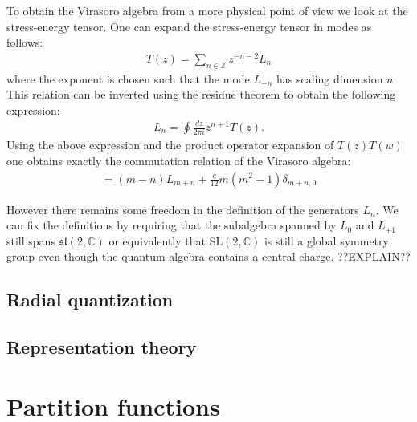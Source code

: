 	To obtain the Virasoro algebra from a more physical point of view we look at the stress-energy tensor. One can expand the stress-energy tensor in modes as follows:
	\begin{gather}
		T(z) = \sum_{n\in\mathbb{Z}}z^{-n-2}L_n
	\end{gather}
	where the exponent is chosen such that the mode $L_{-n}$ has scaling dimension $n$. This relation can be inverted using the residue theorem to obtain the following expression:
	\begin{gather}
		L_n = \oint\frac{dz}{2\pi i}z^{n+1}T(z).
	\end{gather}
	Using the above expression and the product operator expansion of $T(z)T(w)$ one obtains exactly the commutation relation of the Virasoro algebra:
	\begin{gather}
		[L_m, L_n] = (m-n)L_{m+n} + \frac{c}{12}m(m^2-1)\delta_{m+n, 0}
	\end{gather}
	
	However there remains some freedom in the definition of the generators $L_n$. We can fix the definitions by requiring that the subalgebra spanned by $L_0$ and $L_{\pm1}$ still spans $\mathfrak{sl}(2, \mathbb{C})$ or equivalently that SL$(2, \mathbb{C})$ is still a global symmetry group even though the quantum algebra contains a central charge. ??EXPLAIN??

\subsection{Radial quantization}


\subsection{Representation theory}


	
	
\section{Partition functions}